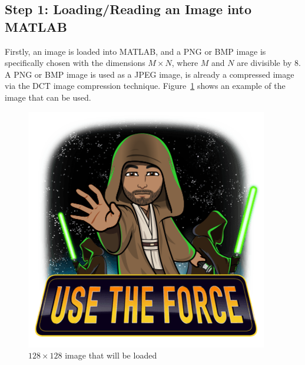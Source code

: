 \documentclass[10pt,twocolumn, a4paper]{witseiepaper}
\begin{document}
\subsection{Step 1: Loading/Reading an Image into MATLAB}
\label{sec: Step 1}
Firstly, an image is loaded into MATLAB, and a PNG or BMP image is specifically chosen with the dimensions $M\times N$, where $M$ and $N$ are divisible by 8. A PNG or BMP image is used as a JPEG image, is already a compressed image via the DCT image compression technique. Figure~\ref{fig: Step 1} shows an example of the image that can be used. 
\begin{figure}[h!]
\renewcommand{\thefigure}{\arabic{figure}}
\centering
\includegraphics[scale=0.5, frame]{Step1.png}
\caption{$128\times 128$ image that will be loaded}
\label{fig: Step 1}
\end{figure}
\end{document}
